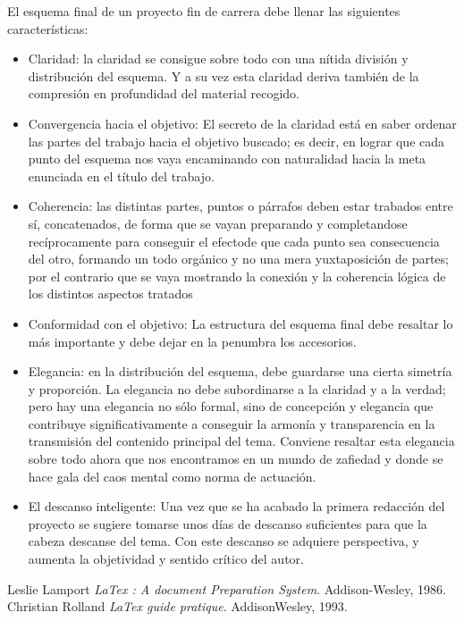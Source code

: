 \documentclass[12pt,a4paper,spanish]{book}
\begin{document}
El esquema final de un proyecto fin de carrera debe llenar las
siguientes características:
\begin{itemize}
\item Claridad: la claridad se consigue sobre todo con una nítida
división y distribución del esquema. Y a su vez esta
 claridad deriva también de la compresión en profundidad del
material recogido.
\item Convergencia hacia el objetivo: El secreto de la claridad
está en saber ordenar las partes del trabajo hacia el
 objetivo buscado; es decir, en lograr que cada punto del
esquema nos vaya encaminando con naturalidad hacia la meta
 enunciada en el título del trabajo.
\item Coherencia: las distintas partes, puntos o párrafos deben
estar trabados entre sí, concatenados, de forma que se 
 vayan preparando y completandose recíprocamente para
conseguir el efectode que cada punto sea consecuencia del otro,
 formando un todo orgánico y no una mera yuxtaposición de
partes; por el contrario que se vaya mostrando la conexión
 y la coherencia lógica de los distintos aspectos tratados
\item Conformidad con el objetivo: La estructura del esquema final
debe resaltar lo más importante y debe dejar en la
 penumbra los accesorios.
\item Elegancia: en la distribución del esquema, debe guardarse una
cierta simetría y proporción. La elegancia no debe
 subordinarse a la claridad y a la verdad; pero hay una
elegancia no sólo formal, sino de concepción y elegancia
 que contribuye significativamente a conseguir la armonía y
transparencia en la transmisión del contenido principal
 del tema. Conviene resaltar esta elegancia sobre todo ahora
que nos encontramos en un mundo de zafiedad y donde se
 hace gala del caos mental como norma de actuación.
\item El descanso inteligente: Una vez que se ha acabado la primera
redacción del proyecto se sugiere tomarse unos
 días de descanso suficientes para que la cabeza descanse del
tema. Con este descanso se adquiere perspectiva,
 y aumenta la objetividad y sentido crítico del autor.
\end{itemize}
\begin{thebibliography}{1}
 Leslie Lamport {\em LaTex : A document Preparation
System}. Addison-Wesley, 1986.
 Christian Rolland {\em LaTex guide pratique}. AddisonWesley, 1993.
\end{thebibliography}
\end{document}
